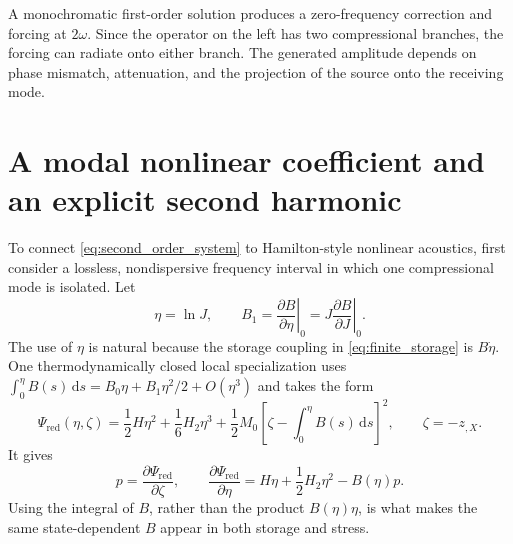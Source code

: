 \documentclass[11pt]{article}
\begin{document}
A monochromatic first-order solution produces a zero-frequency correction and
forcing at \(2\omega\).  Since the operator on the left has two compressional
branches, the forcing can radiate onto either branch.  The generated amplitude
depends on phase mismatch, attenuation, and the projection of the source onto
the receiving mode.

\section{A modal nonlinear coefficient and an explicit second harmonic}

To connect \eqref{eq:second_order_system} to Hamilton-style nonlinear
acoustics, first consider a lossless, nondispersive frequency interval in which
one compressional mode is isolated.  Let
\begin{equation}
    \eta=\ln J,
    \qquad
    B_1=
    \left.
    \frac{\partial B}{\partial\eta}
    \right|_0
    =\left.
    J\frac{\partial B}{\partial J}
    \right|_0.
    \label{eq:biot_logarithmic_slope}
\end{equation}
The use of \(\eta\) is natural because the storage coupling in
\eqref{eq:finite_storage} is \(B\dot\eta\).  One thermodynamically closed local
specialization uses
\(\int_0^\eta B(s)\,\mathrm ds
=B_0\eta+B_1\eta^2/2+O(\eta^3)\) and takes the form
\begin{equation}
    \Psi_{\mathrm{red}}(\eta,\zeta)
    =\frac{1}{2}H\eta^2+\frac{1}{6}H_2\eta^3
    +\frac{1}{2}M_0
    \left[
        \zeta-\int_0^\eta B(s)\,\mathrm ds
    \right]^2,
    \qquad
    \zeta=-z_{,X}.
    \label{eq:reduced_energy}
\end{equation}
It gives
\begin{equation}
    p=\frac{\partial\Psi_{\mathrm{red}}}{\partial\zeta},
    \qquad
    \frac{\partial\Psi_{\mathrm{red}}}{\partial\eta}
    =H\eta+\frac{1}{2}H_2\eta^2-B(\eta)p.
    \label{eq:reduced_conjugates}
\end{equation}
Using the integral of \(B\), rather than the product \(B(\eta)\eta\), is what
makes the same state-dependent \(B\) appear in both storage and stress.
\end{document}
